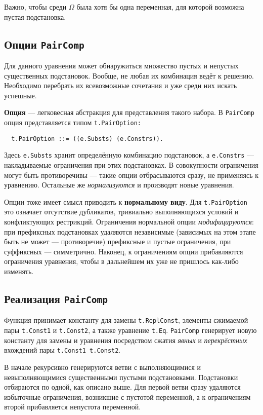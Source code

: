 \documentclass[12pt]{article}
\begin{document}
Важно, чтобы среди $\Omega$ была хотя бы одна переменная, для которой возможна
пустая подстановка.

\subsection{Опции \texttt{PairComp}}

Для данного уравнения может обнаружиться множество пустых и непустых
существенных подстановок. Вообще, не любая их комбинация ведёт к решению.
Необходимо перебрать их всевозможные сочетания и уже среди них искать
успешные.

\textbf{Опция} --- легковесная абстракция для представления такого набора. В
\texttt{PairComp} опция представляется типом \texttt{t.PairOption:}
\begin{Verbatim}
  t.PairOption ::= ((e.Substs) (e.Constrs)).
\end{Verbatim}
Здесь \texttt{e.Substs} хранит определённую комбинацию подстановок, а
\texttt{e.Constrs} --- накладываемые ограничения при этих подстановках.
В совокупности ограничения могут быть противоречивы --- такие опции
отбрасываются сразу, не применяясь к уравнению. Остальные же
\textit{нормализуются} и производят новые уравнения.

Опции тоже имеет смысл приводить к \textbf{нормальному виду}. Для
\texttt{t.PairOption} это означает отсутствие дубликатов, тривиально
выполняющихся условий и конфликтующих рестрикций. Ограничения нормальной
опции \textit{модифицируются}: при префиксных подстановках удаляются
независимые (зависимых на этом этапе быть не может --- противоречие)
префиксные и пустые ограничения, при суффиксных --- симметрично. Наконец,
к ограничениям опции прибавляются ограничения уравнения, чтобы в дальнейшем
их уже не пришлось как-либо изменять.

\subsection{Реализация \texttt{PairComp}}

Функция принимает константу для замены \texttt{t.ReplConst}, элементы сжимаемой
пары \texttt{t.Const1} и \texttt{t.Const2}, а также уравнение \texttt{t.Eq}.
\texttt{PairComp} генерирует новую константу для замены и уравнения посредством
сжатия \textit{явных} и \textit{перекрёстных} вхождений пары
\texttt{t.Const1 t.Const2}.

В начале рекурсивно генерируются ветви с выполняющимися и невыполняющимися
существенными пустыми подстановками. Подстановки отбираются по одной, как
описано выше. Для первой ветви сразу удаляются избыточные ограничения,
возникшие с пустотой переменной, а к ограничениям второй прибавляется
непустота переменной.
\end{document}
